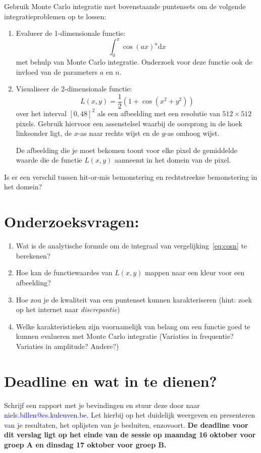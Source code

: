\documentclass[10pt,a4paper]{article}
\begin{document}
Gebruik Monte Carlo integratie met bovenstaande puntensets om de volgende integratieproblemen op te lossen:
\begin{enumerate}
	\item
	Evalueer de 1-dimensionale functie:
		\begin{equation}
			\int_0^\pi \cos\left(ax\right)^n\mathrm{d}x
			\label{eq:cosn}
		\end{equation}
	met behulp van Monte Carlo integratie. Onderzoek voor deze functie ook de invloed van de parameters $a$ en $n$.
	
	\item 
	Visualiseer de 2-dimensionale functie:
	\begin{equation}
		L\left(x,y\right) = \frac{1}{2}\left(1 + \cos\left(x^2+y^2\right)\right)
	\end{equation}
	over het interval \(\left[0,48\right]^2\) als een afbeelding met een resolutie van \(512 \times 512\) pixels. Gebruik hiervoor een assenstelsel waarbij de oorsprong in de hoek linksonder ligt, de $x$-as naar rechts wijst en de $y$-as omhoog wijst.
	
	De afbeelding die je moet bekomen toont voor elke pixel de gemiddelde waarde die de functie \(L\left(x,y\right)\) aanneemt in het domein van de pixel.
\end{enumerate}

Is er een verschil tussen hit-or-mis bemonstering en rechtstreekse bemonstering in het domein?

\section*{Onderzoeksvragen:}
\begin{enumerate}
	\item Wat is de analytische formule om de integraal van vergelijking~\eqref{eq:cosn} te berekenen?
	\item Hoe kan de functiewaardes van \(L\left(x,y\right)\) mappen naar een kleur voor een afbeelding?
	\item Hoe zou je de kwaliteit van een puntenset kunnen karakteriseren (hint: zoek op het internet naar \textit{discrepantie})
	\item Welke karakteristieken zijn voornamelijk van belang om een functie goed te kunnen evalueren met Monte Carlo integratie (Variaties in frequentie? Variaties in amplitude? Andere?)
\end{enumerate}
\section*{Deadline en wat in te dienen?}

Schrijf een rapport met je bevindingen en stuur deze door naar \textcolor{blue}{niels.billen@cs.kuleuven.be}. Let hierbij
op het duidelijk weergeven en presenteren van je resultaten, het oplijsten van je besluiten, enzovoort.
\textbf{De deadline voor dit verslag ligt op het einde van de sessie op maandag 16 oktober voor groep A en dinsdag 17 oktober voor groep B.}
\end{document}
